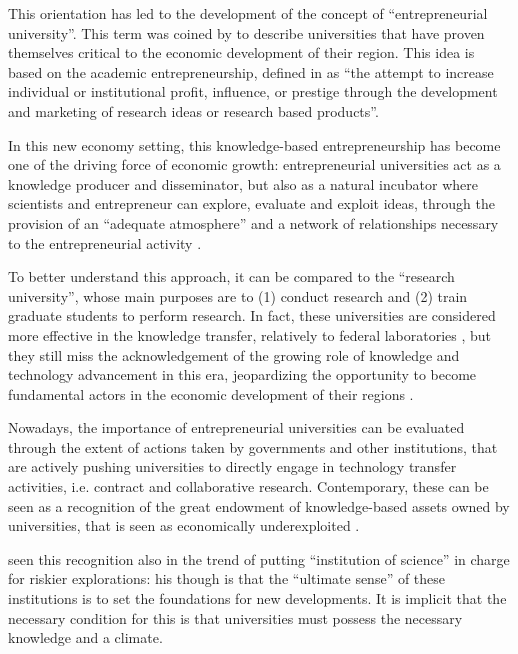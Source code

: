 This orientation has led to the development of the concept of \enquote{entrepreneurial university}. This term was coined by \citet{Etzkowitz1998} to describe universities that have proven themselves critical to the economic development of their region. This idea is based on the academic entrepreneurship, defined in \citet{Louis1989} as \enquote{the attempt to increase individual or institutional profit, influence, or prestige through the development and marketing of research ideas or research based products}.

In this new economy setting, this knowledge-based entrepreneurship has become one of the driving force of economic growth: entrepreneurial universities act as a knowledge producer and disseminator, but also as a natural incubator where scientists and entrepreneur can explore, evaluate and exploit ideas, through the provision of an \enquote{adequate atmosphere} and a network of relationships necessary to the entrepreneurial activity \citep{Guerrero2014}.

To better understand this approach, it can be compared to the \enquote{research university}, whose main purposes are to (1) conduct research and (2) train graduate students to perform research. In fact, these universities are considered more effective in the knowledge transfer, relatively to federal laboratories \citep{Rogers2001}, but they still miss the acknowledgement of the growing role of knowledge and technology advancement in this era, jeopardizing the opportunity to become fundamental actors in the economic development of their regions \citep{OShea2004}.

Nowadays, the importance of entrepreneurial universities can be evaluated through the extent of actions taken by governments and other institutions, that are actively pushing universities to directly engage in technology transfer activities, i.e. contract and collaborative research. Contemporary, these can be seen as a recognition of the great endowment of knowledge-based assets owned by universities, that is seen as economically underexploited \citep{Tijssen2006}. 

\citet{Balconi2006} seen this recognition also in the trend of putting \enquote{institution of science} in charge for riskier explorations: his though is that the \enquote{ultimate sense} of these institutions is to set the foundations for new developments. It is implicit that the necessary condition for this is that universities must possess the necessary knowledge and a climate.

